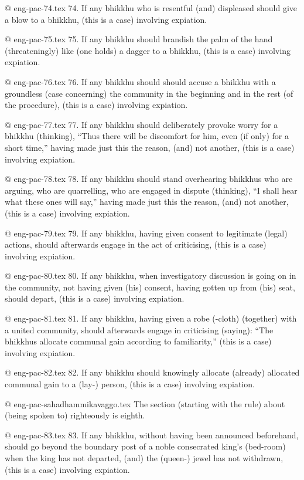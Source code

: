 @ eng-pac-74.tex
74. If any bhikkhu who is resentful (and) displeased should give a blow to a bhikkhu, (this is a case) involving expiation.

@ eng-pac-75.tex
75. If any bhikkhu should brandish the palm of the hand (threateningly) like (one holds) a dagger to a bhikkhu, (this is a case) involving expiation.

@ eng-pac-76.tex
76. If any bhikkhu should should accuse a bhikkhu with a groundless (case concerning) the community in the beginning and in the rest (of the procedure), (this is a case) involving expiation.

@ eng-pac-77.tex
77. If any bhikkhu should deliberately provoke worry for a bhikkhu (thinking), “Thus there will be discomfort for him, even (if only) for a short time,” having made just this the reason, (and) not another, (this is a case) involving expiation.

@ eng-pac-78.tex
78. If any bhikkhu should stand overhearing bhikkhus who are arguing, who are quarrelling, who are engaged in dispute (thinking), “I shall hear what these ones will say,” having made just this the reason, (and) not another, (this is a case) involving expiation.

@ eng-pac-79.tex
79. If any bhikkhu, having given consent to legitimate (legal) actions, should afterwards engage in the act of criticising, (this is a case) involving expiation.

@ eng-pac-80.tex
80. If any bhikkhu, when investigatory discussion is going on in the community, not having given (his) consent, having gotten up from (his) seat, should depart, (this is a case) involving expiation.

@ eng-pac-81.tex
81. If any bhikkhu, having given a robe (-cloth) (together) with a united community, should afterwards engage in criticising (saying): “The bhikkhus allocate communal gain according to familiarity,” (this is a case) involving expiation.

@ eng-pac-82.tex
82. If any bhikkhu should knowingly allocate (already) allocated communal gain to a (lay-) person, (this is a case) involving expiation.

@ eng-pac-sahadhammikavaggo.tex
The section (starting with the rule) about (being spoken to) righteously is eighth.

@ eng-pac-83.tex
83. If any bhikkhu, without having been announced beforehand, should go beyond the boundary post of a noble consecrated king's (bed-room) when the king has not departed, (and) the (queen-) jewel has not withdrawn, (this is a case) involving expiation.


